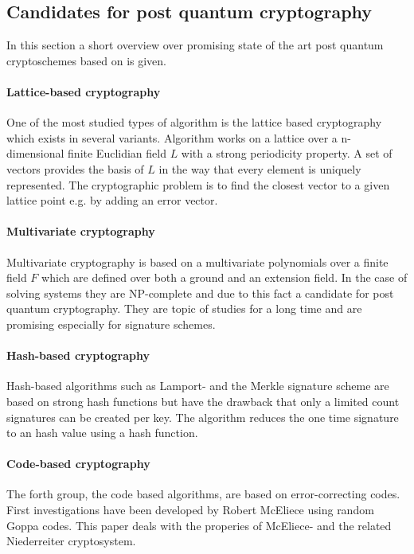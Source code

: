 \subsection{Candidates for post quantum cryptography}
\label{pqalgcand}
In this section a short overview over promising state of the art post quantum cryptoschemes based on \cite{bernstein2009introduction} is given. 
\paragraph*{Lattice-based cryptography}
One of the most studied types of algorithm is the lattice based cryptography which exists in several variants. Algorithm works on a lattice over a n-dimensional finite Euclidian field $L$ with a strong periodicity property. A set of vectors provides the basis of $L$ in the way that every element is uniquely represented. The cryptographic problem is to find the closest vector to a given lattice point e.g. by adding an error vector\cite{bernstein2009introduction}\cite{wiki:lattice}.
\paragraph*{Multivariate cryptography}
Multivariate cryptography is based on a multivariate polynomials over a finite field $F$ which are defined over both a ground and an extension field. In the case of solving systems they are NP-complete and due to this fact a candidate for post quantum cryptography. They are topic of studies for a long time and  are promising especially for signature schemes\cite{bernstein2009introduction}\cite{wiki:multi}.

\paragraph*{Hash-based cryptography}
Hash-based algorithms such as Lamport-\cite{wiki:lamportsig} and the Merkle\cite{wiki:merklesig} signature scheme are based on strong hash functions but have the drawback that only a limited count signatures can be created per key. The algorithm reduces the one time signature to an hash value using a hash function\cite{bernstein2009introduction}.

\paragraph*{Code-based cryptography}
The forth group, the code based algorithms, are based on error-correcting codes. First investigations have been developed by Robert McEliece using random Goppa codes\cite{wiki:bingoppa}. This paper deals with the properies of McEliece- and the related Niederreiter cryptosystem\cite{bernstein2009introduction}\cite{wiki:niederreither}.


